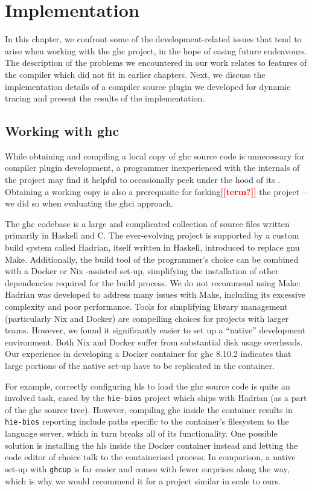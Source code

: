 \documentclass[thesis=B,english]{FITthesis}[2019/12/23]
\newcommand{\todo}[1]{\textcolor{red}{\textbf{[[#1]]}}}
\begin{document}
\chapter{Implementation}
In this chapter, we confront some of the development-related issues that tend
to arise when working with the \acrshort{ghc} project, in the hope of easing
future endeavours. The description of the problems we encountered in our work
relates to features of the compiler which did not fit in earlier chapters.
Next, we discuss the implementation details of a compiler source plugin we
developed for dynamic tracing and present the results of the implementation.


\section{Working with \acrshort{ghc}}
While obtaining and compiling a local copy of \acrshort{ghc} source code is
unnecessary for compiler plugin development, a programmer inexperienced with
the internals of the project may find it helpful to occasionally peek under the
hood of its . Obtaining a working copy is also a prerequisite
for forking\todo{term?} the project -- we did so when evaluating the
\acrshort{ghci} approach.

The \acrshort{ghc} codebase is a large and complicated collection of source
files written primarily in Haskell and C\cite{arch-ghc}. The ever-evolving
project is supported by a custom build system called Hadrian\cite{hadrian},
itself written in Haskell, introduced to replace \acrshort{gnu} Make.
Additionally, the build tool of the programmer's choice can be combined with a
Docker or Nix -assisted set-up, simplifying the installation of other
dependencies required for the build process. We do not recommend using Make:
Hadrian was developed to address many issues with Make, including its excessive
complexity and poor performance.  Tools for simplifying library management
(particularly Nix and Docker) are compelling choices for projects with larger
teams. However, we found it significantly easier to set up a ``native''
development environment. Both Nix and Docker suffer from substantial disk usage
overheads. Our experience in developing a Docker container for \acrshort{ghc}
8.10.2 indicates that large portions of the native set-up have to be replicated
in the container.

For example, correctly configuring \acrshort{hls} to load the \acrshort{ghc}
source code is quite an involved task, eased by the \texttt{hie-bios}
project\cite{gh-hie-bios} which ships with Hadrian (as a part of the
\acrshort{ghc} source tree). However, compiling \acrshort{ghc} inside the
container results in \texttt{hie-bios} reporting include paths specific to the
container's file\-system to the language server, which in turn breaks all of
its functionality. One possible solution is installing the \acrshort{hls}
inside the Docker container instead and letting the code editor of choice talk
to the containerised process. In comparison, a native set-up with
\texttt{ghcup} is far easier and comes with fewer surprises along the way,
which is why we would recommend it for a project similar in scale to ours.
\end{document}
